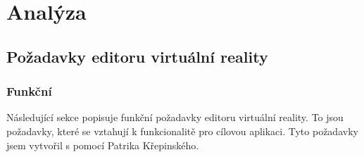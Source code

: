 \documentclass[thesis=B,czech]{FITthesis}[2012/06/26]
\begin{document}
\chapter{Analýza}
    \section{Požadavky editoru virtuální reality}
        \subsection{Funkční} \label{sec:analFP}
            Následující sekce popisuje funkční požadavky editoru virtuální reality. To jsou požadavky, které se vztahují k funkcionalitě pro cílovou aplikaci. Tyto požadavky jsem vytvořil s pomocí Patrika Křepinského.
            
\end{document}
